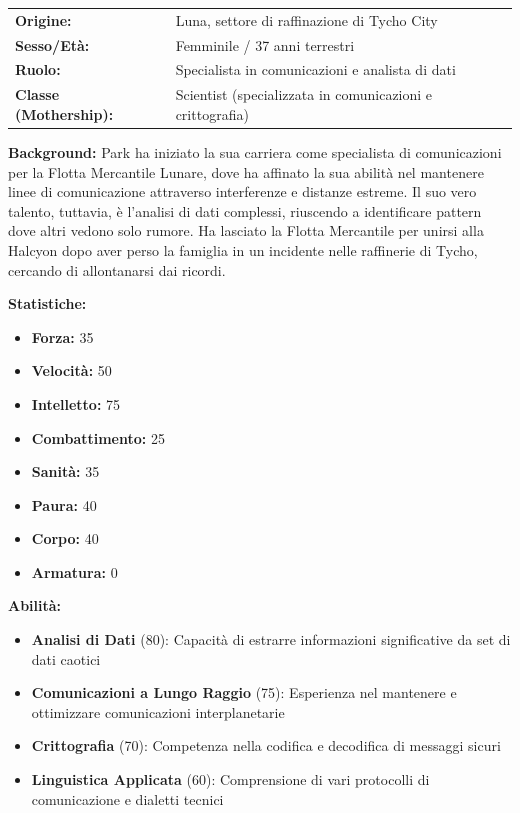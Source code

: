\documentclass[11pt,a4paper]{article}
\begin{document}
\begin{tcolorbox}[colback=mininglightorange!20, colframe=miningorange]
\begin{tabularx}{\textwidth}{lX}
\textbf{Origine:} & Luna, settore di raffinazione di Tycho City \\
\textbf{Sesso/Età:} & Femminile / 37 anni terrestri \\
\textbf{Ruolo:} & Specialista in comunicazioni e analista di dati \\
\textbf{Classe (Mothership):} & Scientist (specializzata in comunicazioni e crittografia) \\
\end{tabularx}

\textbf{Background:} Park ha iniziato la sua carriera come specialista di comunicazioni per la Flotta Mercantile Lunare, dove ha affinato la sua abilità nel mantenere linee di comunicazione attraverso interferenze e distanze estreme. Il suo vero talento, tuttavia, è l'analisi di dati complessi, riuscendo a identificare pattern dove altri vedono solo rumore. Ha lasciato la Flotta Mercantile per unirsi alla Halcyon dopo aver perso la famiglia in un incidente nelle raffinerie di Tycho, cercando di allontanarsi dai ricordi.

\textbf{Statistiche:}
\begin{itemize}[leftmargin=*]
\item \textbf{Forza:} 35
\item \textbf{Velocità:} 50
\item \textbf{Intelletto:} 75
\item \textbf{Combattimento:} 25
\item \textbf{Sanità:} 35
\item \textbf{Paura:} 40
\item \textbf{Corpo:} 40
\item \textbf{Armatura:} 0
\end{itemize}

\textbf{Abilità:}
\begin{itemize}[leftmargin=*]
\item \textbf{Analisi di Dati} (80): Capacità di estrarre informazioni significative da set di dati caotici
\item \textbf{Comunicazioni a Lungo Raggio} (75): Esperienza nel mantenere e ottimizzare comunicazioni interplanetarie
\item \textbf{Crittografia} (70): Competenza nella codifica e decodifica di messaggi sicuri
\item \textbf{Linguistica Applicata} (60): Comprensione di vari protocolli di comunicazione e dialetti tecnici
\end{itemize}


\end{tcolorbox}
\end{document}
